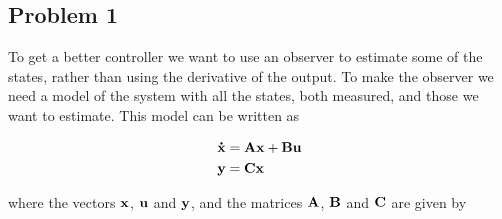 \subsection{Problem 1}
To get a better controller we want to use an observer to estimate some of the states, rather than using the derivative of the output. To make the observer we need a model of the system with all the states, both measured, and those we want to estimate. This model can be written as

\begin{subequations}
	\begin{align*}
		\mathbf{\dot x} &= \mathbf{A}\mathbf{x} + \mathbf{B}\mathbf{u}\\
		\mathbf{y} &= \mathbf{C}\mathbf{x}
	\end{align*}
\end{subequations}

where the vectors $\mathbf{x}$, $\mathbf{u}$ and $\mathbf{y}$, and the matrices $\mathbf{A}$, $\mathbf{B}$ and $\mathbf{C}$ are given by


